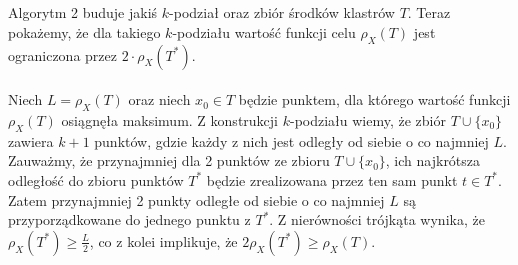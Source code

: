 \\~\\
Algorytm 2 buduje jakiś $k$-podział oraz zbiór środków klastrów $T$.
Teraz pokażemy, że dla takiego $k$-podziału wartość funkcji celu $\rho_{X}(T)$ jest ograniczona przez $2 \cdot \rho_{X}(T^{*})$.
\\~\\
Niech $L=\rho_{X}(T)$ oraz niech $x_{0} \in T$ będzie punktem, dla którego wartość funkcji $\rho_{X}(T)$ osiągnęła maksimum.
Z konstrukcji $k$-podziału wiemy, że zbiór $T\cup \{x_{0}\}$ zawiera $k+1$ punktów, gdzie każdy z nich jest odległy od siebie o co najmniej $L$.
Zauważmy, że przynajmniej dla 2 punktów ze zbioru $T\cup \{x_{0}\}$, ich najkrótsza odległość do zbioru punktów $T^{*}$ będzie zrealizowana przez ten sam punkt $t \in T^{*}$.
Zatem przynajmniej 2 punkty odległe od siebie o co najmniej $L$ są przyporządkowane do jednego punktu z $T^{*}$.
Z nierówności trójkąta wynika, że $\rho_{X}(T^{*}) \geq \frac{L}{2}$, co z kolei implikuje, że $2\rho_{X}(T^{*}) \geq \rho_{X}(T)$.